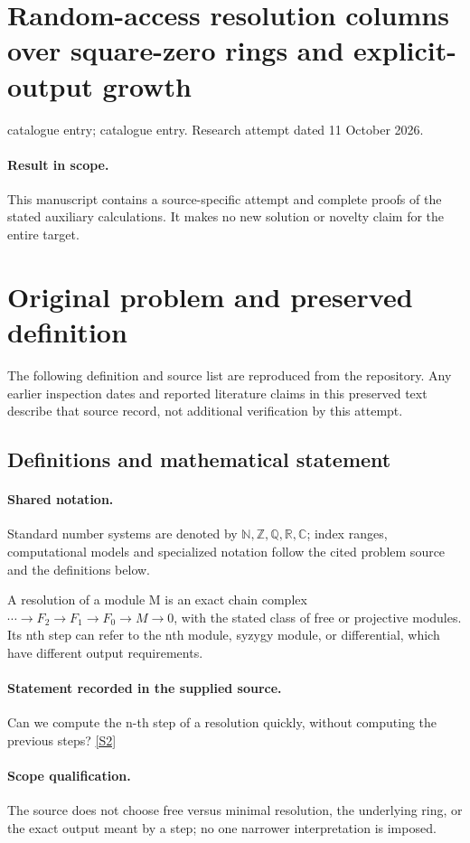 \documentclass[11pt]{article}
\begin{document}
\section*{Random-access resolution columns over square-zero rings and explicit-output growth}
\noindent catalogue entry; catalogue entry. Research attempt dated 11 October 2026.
\paragraph{Result in scope.}This manuscript contains a source-specific attempt and complete proofs of the stated auxiliary calculations. It makes no new solution or novelty claim for the entire target.
\section{Original problem and preserved definition}
The following definition and source list are reproduced from the repository. Any earlier inspection dates and reported literature claims in this preserved text describe that source record, not additional verification by this attempt.
\subsection{Definitions and mathematical statement}

\paragraph{Shared notation.}Standard number systems are denoted by $\mathbb N,\mathbb Z,\mathbb Q,\mathbb R,\mathbb C$; index ranges, computational models and specialized notation follow the cited problem source and the definitions below.


A resolution of a module M is an exact chain complex $\cdots\to F_2\to F_1\to F_0\to M\to0$, with the stated class of free or projective modules. Its nth step can refer to the nth module, syzygy module, or differential, which have different output requirements.
\paragraph{Statement recorded in the supplied source.}
Can we compute the n-th step of a resolution quickly, without computing the previous steps? \href{http://aimpl.org/macaulay2efie/3/}{[S2]}
\paragraph{Scope qualification.}
The source does not choose free versus minimal resolution, the underlying ring, or the exact output meant by a step; no one narrower interpretation is imposed.
\end{document}
